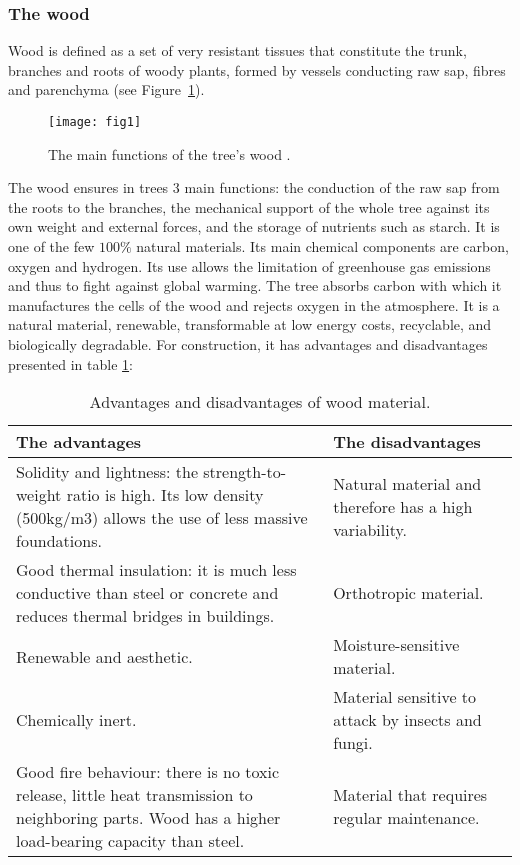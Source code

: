 \subsubsection{The wood}

Wood is defined as a set of very resistant tissues that constitute the trunk, branches and roots of woody plants, formed by vessels conducting raw sap, fibres and parenchyma (see Figure~\ref{fig:fig1}).


\begin{figure}[htp]
	\centering
	\texttt{[image: fig1]}
	\caption{The main functions of the tree's wood \citep{Thibaut2015phd}.}
	\label{fig:fig1}
\end{figure}

The wood ensures in trees 3 main functions: the conduction of the raw sap from the roots to the branches, the mechanical support of the whole tree against its own weight and external forces, and the storage of nutrients such as starch. It is one of the few $100 \%$ natural materials. Its main chemical components are carbon, oxygen and hydrogen. Its use allows the limitation of greenhouse gas emissions and thus to fight against global warming. The tree absorbs carbon with which it manufactures the cells of the wood and rejects oxygen in the atmosphere. It is a natural material, renewable, transformable at low energy costs, recyclable, and biologically degradable. For construction, it has advantages and disadvantages presented in table \ref{tab:advantages}:

\begin{table}[h]
	\centering
	\begin{tabular}{@{}p{}p{}@{}}
		\toprule
		\textbf{The advantages} & \textbf{The disadvantages} \\\midrule
		Solidity and lightness: the strength-to-weight ratio is high. Its low density (500kg/m3) allows the use of less massive foundations. & Natural material and therefore has a high variability. \\
		\hline
		Good thermal insulation: it is much less conductive than steel or concrete and reduces thermal bridges in buildings. & Orthotropic material. \\
		\hline
		Renewable and aesthetic. & Moisture-sensitive material. \\
		\hline
		Chemically inert. & Material sensitive to attack by insects and fungi. \\
		\hline
		Good fire behaviour: there is no toxic release, little heat transmission to neighboring parts. Wood has a higher load-bearing capacity than steel. & Material that requires regular maintenance. \\\bottomrule
	\end{tabular}
	\caption{Advantages and disadvantages of wood material.}
	\label{tab:advantages}
\end{table}


